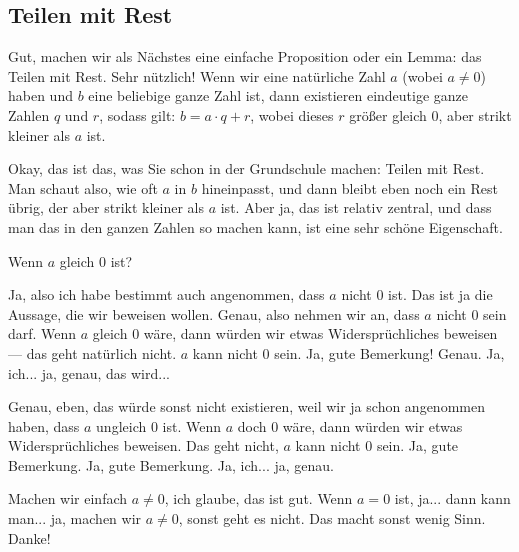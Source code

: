 \subsection{Teilen mit Rest}

\begin{spoken-clean}[00:07:09 - 00:12:02]
Gut, machen wir als Nächstes eine einfache Proposition oder ein Lemma: das Teilen mit Rest. Sehr nützlich! Wenn wir eine natürliche Zahl $a$ (wobei $a \neq 0$) haben und $b$ eine beliebige ganze Zahl ist, dann existieren eindeutige ganze Zahlen $q$ und $r$, sodass gilt: $b = a \cdot q + r$, wobei dieses $r$ größer gleich $0$, aber strikt kleiner als $a$ ist.

Okay, das ist das, was Sie schon in der Grundschule machen: Teilen mit Rest. Man schaut also, wie oft $a$ in $b$ hineinpasst, und dann bleibt eben noch ein Rest übrig, der aber strikt kleiner als $a$ ist. Aber ja, das ist relativ zentral, und dass man das in den ganzen Zahlen so machen kann, ist eine sehr schöne Eigenschaft.
\end{spoken-clean}

\begin{math-stroke}
\end{math-stroke}

\begin{student-interaction}[Studentenfrage]
Wenn $a$ gleich $0$ ist?
\end{student-interaction}

\begin{spoken-clean}[00:12:02 - 00:13:37]
Ja, also ich habe bestimmt auch angenommen, dass $a$ nicht $0$ ist. Das ist ja die Aussage, die wir beweisen wollen. Genau, also nehmen wir an, dass $a$ nicht $0$ sein darf. Wenn $a$ gleich $0$ wäre, dann würden wir etwas Widersprüchliches beweisen --- das geht natürlich nicht. $a$ kann nicht $0$ sein. Ja, gute Bemerkung! Genau. Ja, ich... ja, genau, das wird... 

Genau, eben, das würde sonst nicht existieren, weil wir ja schon angenommen haben, dass $a$ ungleich $0$ ist. Wenn $a$ doch $0$ wäre, dann würden wir etwas Widersprüchliches beweisen. Das geht nicht, $a$ kann nicht $0$ sein. Ja, gute Bemerkung. Ja, gute Bemerkung. Ja, ich... ja, genau.

Machen wir einfach $a \neq 0$, ich glaube, das ist gut. Wenn $a = 0$ ist, ja... dann kann man... ja, machen wir $a \neq 0$, sonst geht es nicht. Das macht sonst wenig Sinn. Danke!
\end{spoken-clean}

